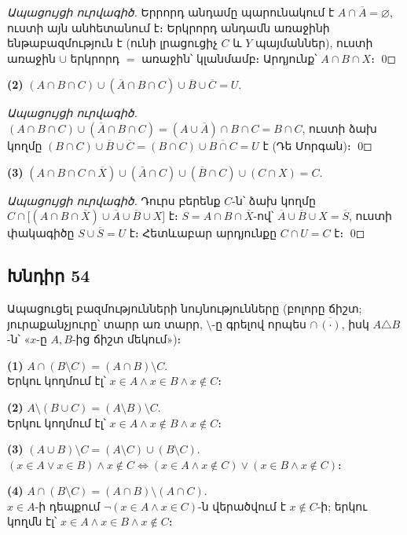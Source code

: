 \textit{Ապացույցի ուրվագիծ.} Երրորդ անդամը պարունակում է $A \cap \overline{A} = \varnothing$, ուստի այն անհետանում է։ Երկրորդ անդամն առաջինի ենթաբազմություն է (ունի լրացուցիչ $C$ և $Y$ պայմաններ), ուստի առաջին $\cup$ երկրորդ $=$ առաջին՝ կլանմամբ։ Արդյունք՝ $A \cap B \cap X$։ \qed

\textbf{(2)} $(A \cap B \cap C) \cup (\overline{A} \cap B \cap C) \cup \overline{B} \cup \overline{C} = U$.

\textit{Ապացույցի ուրվագիծ.} $(A \cap B \cap C) \cup (\overline{A} \cap B \cap C) = (A \cup \overline{A}) \cap B \cap C = B \cap C$, ուստի ձախ կողմը $(B \cap C) \cup \overline{B} \cup \overline{C} = (B \cap C) \cup \overline{B \cap C} = U$ է (Դե Մորգան)։ \qed

\textbf{(3)} $(A \cap B \cap C \cap \overline{X}) \cup (\overline{A} \cap C) \cup (\overline{B} \cap C) \cup (C \cap X) = C$.

\textit{Ապացույցի ուրվագիծ.} Դուրս բերենք $C$-ն՝ ձախ կողմը $C \cap \bigl[(A \cap B \cap \overline{X}) \cup \overline{A} \cup \overline{B} \cup X\bigr]$ է։ $S = A \cap B \cap \overline{X}$-ով՝ $\overline{A} \cup \overline{B} \cup X = \overline{S}$, ուստի փակագիծը $S \cup \overline{S} = U$ է։ Հետևաբար արդյունքը $C \cap U = C$ է։ \qed

\subsection*{Խնդիր 54}
Ապացուցել բազմությունների նույնությունները (բոլորը ճիշտ; յուրաքանչյուրը՝ տարր առ տարր, $\setminus$-ը գրելով որպես $\cap\,\overline{(\cdot)}$, իսկ $A \triangle B$-ն՝ «$x$-ը $A, B$-ից ճիշտ մեկում»)։

\textbf{(1)} $A \cap (B \setminus C) = (A \cap B) \setminus C$. \\
Երկու կողմում էլ՝ $x \in A \land x \in B \land x \notin C$։ \checkmark

\textbf{(2)} $A \setminus (B \cup C) = (A \setminus B) \setminus C$. \\
Երկու կողմում էլ՝ $x \in A \land x \notin B \land x \notin C$։ \checkmark

\textbf{(3)} $(A \cup B) \setminus C = (A \setminus C) \cup (B \setminus C)$. \\
$(x \in A \lor x \in B) \land x \notin C \iff (x \in A \land x \notin C) \lor (x \in B \land x \notin C)$։ \checkmark

\textbf{(4)} $A \cap (B \setminus C) = (A \cap B) \setminus (A \cap C)$. \\
$x \in A$-ի դեպքում $\lnot(x \in A \land x \in C)$-ն վերածվում է $x \notin C$-ի; երկու կողմն էլ՝ $x \in A \land x \in B \land x \notin C$։ \checkmark

